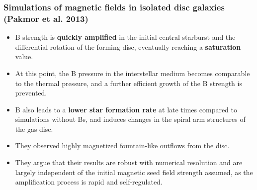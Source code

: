 \documentclass[10pt,aspectratio=169]{beamer}
\begin{document}
\begin{frame}
	\frametitle{Simulations of magnetic fields in isolated disc galaxies (Pakmor et al. 2013)}	
	\begin{itemize}
		\item B strength is \textbf{quickly amplified} in the initial central starburst and the differential rotation of the forming disc, eventually reaching a \textbf{saturation} value.
		\item At this point, the B pressure in the interstellar medium becomes comparable to the
		thermal pressure, and a further efficient growth of the B strength is prevented.
		\item B also leads to a \textbf{lower star formation rate} at late times compared to simulations without Bs, and induces changes in the spiral arm structures of the gas disc. 
		\item They observed highly magnetized fountain-like outflows from the disc.
		\item They argue that their results are robust with numerical resolution and are largely independent of the initial magnetic seed field strength assumed, as the amplification process is rapid and self-regulated.
	\end{itemize}
\end{frame}
\end{document}
